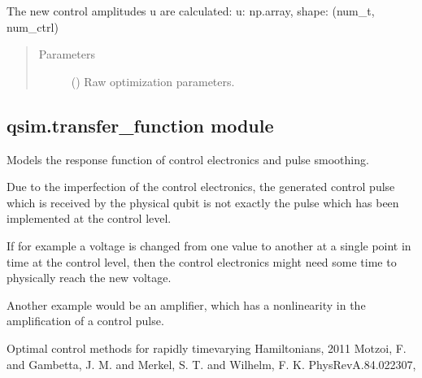 \documentclass[letterpaper,10pt,english]{sphinxmanual}
\begin{document}
\begin{fulllineitems}
\begin{fulllineitems}
The new control amplitudes u are calculated:
u: np.array, shape: (num\_t, num\_ctrl)
\begin{quote}\begin{description}
\item[{Parameters}] \leavevmode
{} (\sphinxstyleliteralemphasis{\sphinxupquote{, }}\sphinxstyleliteralemphasis{\sphinxupquote{ (}}\sphinxstyleliteralemphasis{\sphinxupquote{, }}\sphinxstyleliteralemphasis{\sphinxupquote{)}}) \textendash{} Raw optimization parameters.

\end{description}\end{quote}

\end{fulllineitems}


\end{fulllineitems}



\subsection{qsim.transfer\_function module}
\label{\detokenize{qsim:module-qsim.transfer_function}}\label{\detokenize{qsim:qsim-transfer-function-module}}
Models the response function of control electronics and pulse smoothing.

Due to the imperfection of the control electronics, the generated control pulse
which is received by the physical qubit is not exactly the pulse which has been
implemented at the control level.

If for example a voltage is changed from one
value to another at a single point in time at the control level, then the
control electronics might need some time to physically reach the new voltage.

Another example would be an amplifier, which has a non\sphinxhyphen{}linearity in the
amplification of a control pulse.

Optimal control methods for rapidly time\sphinxhyphen{}varying Hamiltonians, 2011
Motzoi, F. and Gambetta, J. M. and Merkel, S. T. and Wilhelm, F. K.
PhysRevA.84.022307, 
\end{document}
